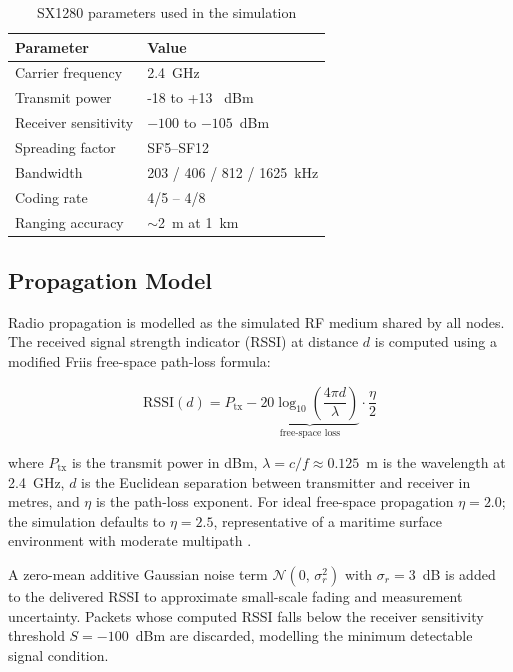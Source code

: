 \begin{table}[ht]
\centering
\caption{SX1280 parameters used in the simulation}
\label{tab:sx1280_params}
\begin{tabular}{ll}
\toprule
\textbf{Parameter}        & \textbf{Value}          \\
\midrule
Carrier frequency         & 2.4~GHz                 \\
Transmit power            & -18 to +13 ~dBm  \\
Receiver sensitivity      & $-100$ to $-105$~dBm    \\
Spreading factor          & SF5–SF12                \\
Bandwidth                 & 203 / 406 / 812 / 1625~kHz  \\
Coding rate               & 4/5 – 4/8               \\
Ranging accuracy          & $\sim$2~m at 1~km       \\
\bottomrule
\end{tabular}
\end{table}

\subsection{Propagation Model}
\label{sec:lora_propagation}

Radio propagation is modelled as the simulated RF medium shared by all nodes. The received signal strength indicator (RSSI) at distance $d$ is computed
using a modified Friis free-space path-loss formula:

\begin{equation}
    \mathrm{RSSI}(d) = P_\mathrm{tx}
        - \underbrace{20 \log_{10}\!\left(\frac{4\pi d}{\lambda}\right)}_{\text{free-space loss}}
        \cdot \frac{\eta}{2}
    \label{eq:rssi}
\end{equation}

\noindent where $P_\mathrm{tx}$ is the transmit power in dBm,
$\lambda = c/f \approx 0.125$~m is the wavelength at 2.4~GHz, $d$ is
the Euclidean separation between transmitter and receiver in metres,
and $\eta$ is the path-loss exponent. For ideal free-space propagation
$\eta = 2.0$; the simulation defaults to $\eta = 2.5$, representative
of a maritime surface environment with moderate multipath
\cite{rappaport2002wireless}.

A zero-mean additive Gaussian noise term $\mathcal{N}(0,\,\sigma_r^2)$
with $\sigma_r = 3$~dB is added to the delivered RSSI to approximate
small-scale fading and measurement uncertainty. Packets whose computed
RSSI falls below the receiver sensitivity threshold $S = -100$~dBm are
discarded, modelling the minimum detectable signal condition.

